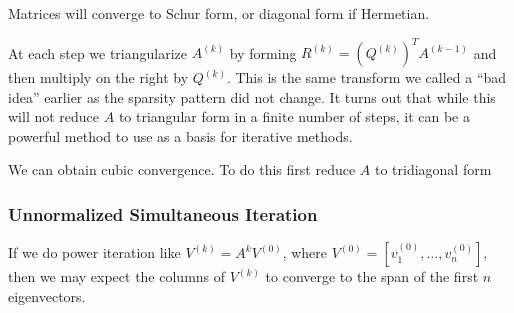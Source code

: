 \documentclass[12pt]{article}
\begin{document}
\begin{algorithm}
\begin{algorithmic}
\EndFor
\end{algorithmic}
\end{algorithm}

Matrices will converge to Schur form, or diagonal form if Hermetian.

At each step we triangularize \( A^{(k)} \) by forming \( R^{(k)} = (Q^{(k)})^TA^{(k-1)} \) and then multiply on the right by \( Q^{(k)} \). This is the same transform we called a ``bad idea'' earlier as the sparsity pattern did not change. It turns out that while this will not reduce \( A \) to triangular form in a finite number of steps, it can be a powerful method to use as a basis for iterative methods.


We can obtain cubic convergence. To do this first reduce \( A \) to tridiagonal form

\begin{algorithm}
\begin{algorithmic}
    \EndIf
\EndFor
\end{algorithmic}
\end{algorithm}

\subsubsection{Unnormalized Simultaneous Iteration}

If we do power iteration like \( V^{(k)} = A^k V^{(0)} \), where \( V^{(0)} = [v_1^{(0)}, \ldots, v_n^{(0)}] \), then we may expect the columns of \( V^{(k)} \) to converge to the span of the first \( n \) eigenvectors.
\end{document}

